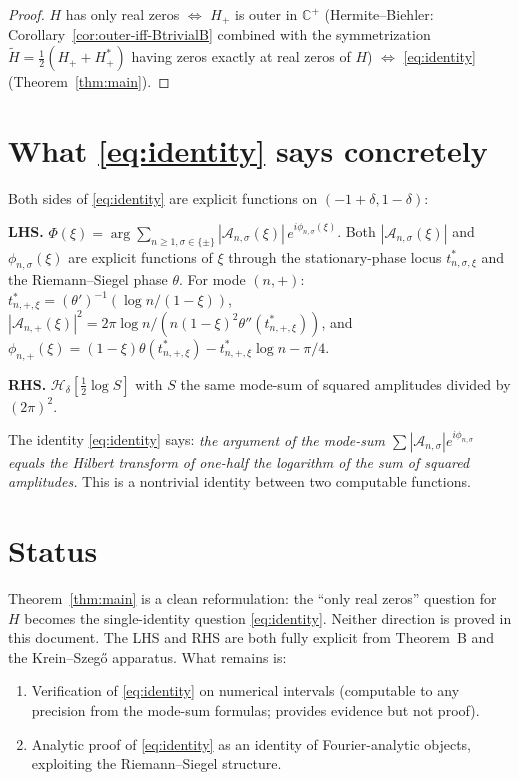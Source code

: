 \documentclass[11pt]{article}
\theoremstyle{definition}
\newcommand{\C}{\mathbb{C}}
\newcommand{\Cpls}{\C^+}
\begin{document}
\begin{proof}
$H$ has only real zeros $\iff$ $H_+$ is outer in $\Cpls$ (Hermite--Biehler: Corollary~\ref{cor:outer-iff-BtrivialB} combined with the symmetrization $\tilde H = \tfrac12(H_+ + H_+^*)$ having zeros exactly at real zeros of $H$) $\iff$ \eqref{eq:identity} (Theorem~\ref{thm:main}).
\end{proof}

\section{What \eqref{eq:identity} says concretely}

Both sides of \eqref{eq:identity} are explicit functions on $(-1+\delta, 1-\delta)$:

\textbf{LHS.} $\Phi(\xi) = \arg\sum_{n \geq 1,\sigma \in \{\pm\}}|\mathcal A_{n,\sigma}(\xi)|\,e^{i\phi_{n,\sigma}(\xi)}$. Both $|\mathcal A_{n,\sigma}(\xi)|$ and $\phi_{n,\sigma}(\xi)$ are explicit functions of $\xi$ through the stationary-phase locus $t^*_{n,\sigma,\xi}$ and the Riemann--Siegel phase $\theta$. For mode $(n, +)$: $t^*_{n,+,\xi} = (\theta')^{-1}(\log n/(1 - \xi))$, $|\mathcal A_{n,+}(\xi)|^2 = 2\pi\log n / (n(1-\xi)^2 \theta''(t^*_{n,+,\xi}))$, and $\phi_{n,+}(\xi) = (1-\xi)\theta(t^*_{n,+,\xi}) - t^*_{n,+,\xi}\log n - \pi/4$.

\textbf{RHS.} $\mathcal H_\delta[\tfrac12\log S]$ with $S$ the same mode-sum of squared amplitudes divided by $(2\pi)^2$.

The identity \eqref{eq:identity} says: \emph{the argument of the mode-sum $\sum|\mathcal A_{n,\sigma}|e^{i\phi_{n,\sigma}}$ equals the Hilbert transform of one-half the logarithm of the sum of squared amplitudes.} This is a nontrivial identity between two computable functions.

\section{Status}

Theorem~\ref{thm:main} is a clean reformulation: the ``only real zeros'' question for $H$ becomes the single-identity question \eqref{eq:identity}. Neither direction is proved in this document. The LHS and RHS are both fully explicit from Theorem~B and the Krein--Szeg\H{o} apparatus. What remains is:

\begin{enumerate}
\item Verification of \eqref{eq:identity} on numerical intervals (computable to any precision from the mode-sum formulas; provides evidence but not proof).
\item Analytic proof of \eqref{eq:identity} as an identity of Fourier-analytic objects, exploiting the Riemann--Siegel structure.
\end{enumerate}
\end{document}
